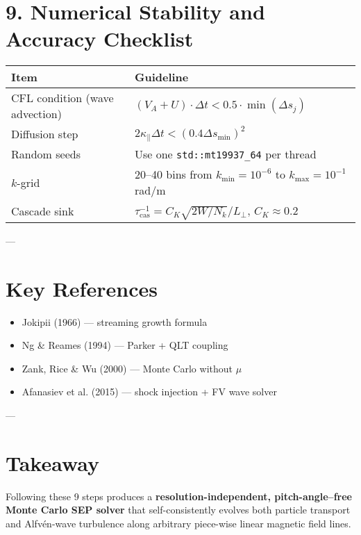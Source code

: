 \section*{9. Numerical Stability and Accuracy Checklist}

\begin{center}
\begin{tabular}{p{5cm} p{9cm}}
\toprule
\textbf{Item} & \textbf{Guideline} \\
\midrule
CFL condition (wave advection) & $(V_A + U) \cdot \Delta t < 0.5 \cdot \min(\Delta s_j)$ \\
Diffusion step & $2 \kappa_\parallel \Delta t < (0.4 \Delta s_{\min})^2$ \\
Random seeds & Use one \texttt{std::mt19937\_64} per thread \\
$k$-grid & 20–40 bins from $k_{\min}=10^{-6}$ to $k_{\max}=10^{-1}$ rad/m \\
Cascade sink & $\tau_{\text{cas}}^{-1} = C_K \sqrt{2W/N_k} / L_\perp$, $C_K \approx 0.2$ \\
\bottomrule
\end{tabular}
\end{center}

---

\section*{Key References}

\begin{itemize}
    \item Jokipii (1966) — streaming growth formula
    \item Ng \& Reames (1994) — Parker + QLT coupling
    \item Zank, Rice \& Wu (2000) — Monte Carlo without $\mu$
    \item Afanasiev et al. (2015) — shock injection + FV wave solver
\end{itemize}

---

\section*{Takeaway}

Following these 9 steps produces a \textbf{resolution-independent, pitch-angle–free Monte Carlo SEP solver} that self-consistently evolves both particle transport and Alfvén-wave turbulence along arbitrary piece-wise linear magnetic field lines.



